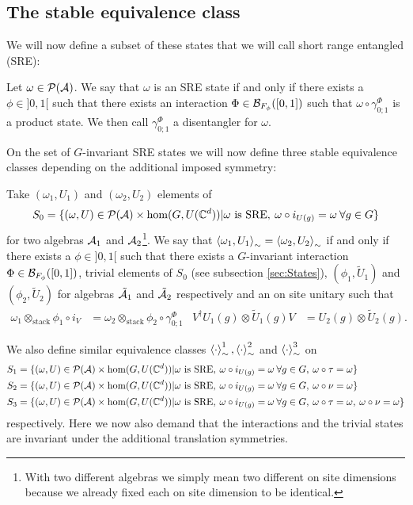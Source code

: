 \documentclass[11pt,a4paper,twoside]{article}
\numberwithin{equation}{section}
\begin{document}
\subsection{The stable equivalence class}\label{sec:StableEquivalenceClasses}
We will now define a subset of these states that we will call short range entangled (SRE):
\begin{definition}\label{def:sre}
	Let $\omega\in\PP(\AA)$. We say that $\omega$ is an SRE state if and only if there exists a $\phi\in]0,1[$ such that there exists an interaction $\Phi\in\BB_{F_\phi}([0,1])$ such that $\omega\circ\gamma^\Phi_{0;1}$ is a product state. We then call $\gamma^\Phi_{0;1}$ a disentangler for $\omega$.
\end{definition}
On the set of $G$-invariant SRE states we will now define three stable equivalence classes depending on the additional imposed symmetry:
\begin{definition}
	Take $(\omega_1,U_1)$ and $(\omega_2,U_2)$ elements of
	\begin{equation}
		S_0=\{(\omega,U)\in\PP(\AA)\times\hom(G,U(\CC^d))|\omega\text{ is SRE},\:\omega\circ i_{U(g)}=\omega\:\forall g\in G\}
	\end{equation}
	for two algebras $\AA_1$ and $\AA_2$\footnote{With two different algebras we simply mean two different on site dimensions because we already fixed each on site dimension to be identical.}. We say that $\expval{\omega_1,U_1}_\sim=\expval{\omega_2,U_2}_\sim$ if and only if there exists a $\phi\in]0,1[$ such that there exists a $G$-invariant interaction $\Phi\in\BB_{F_\phi}([0,1])$, trivial elements of $S_0$ (see subsection \ref{sec:States}), $(\phi_1,\tilde U_1)$ and $(\phi_2,\tilde U_2)$ for algebras $\tilde\AA_1$ and $\tilde\AA_2$ respectively and an on site unitary such that
	\begin{align}
		\omega_1\otimes_{\text{stack}}\phi_1\circ i_V&=\omega_2\otimes_{\text{stack}}\phi_2\circ\gamma^\Phi_{0;1}&V^\dagger U_{1}(g)\otimes \tilde{U}_{1}(g)V&=U_{2}(g)\otimes \tilde{U}_{2}(g).
	\end{align}
\end{definition}
We also define similar equivalence classes $\expval{\cdot}_\sim^1,\expval{\cdot}_\sim^2$ and $\expval{\cdot}_\sim^3$ on
\begin{align}
	S_1&=\{(\omega,U)\in\PP(\AA)\times\hom(G,U(\CC^d))|\omega\text{ is SRE},\:\omega\circ i_{U(g)}=\omega\:\forall g\in G,\:\omega\circ\tau=\omega\}\\
	S_2&=\{(\omega,U)\in\PP(\AA)\times\hom(G,U(\CC^d))|\omega\text{ is SRE},\:\omega\circ i_{U(g)}=\omega\:\forall g\in G,\:\omega\circ\nu=\omega\}\\
	S_3&=\{(\omega,U)\in\PP(\AA)\times\hom(G,U(\CC^d))|\omega\text{ is SRE},\:\omega\circ i_{U(g)}=\omega\:\forall g\in G,\:\omega\circ\tau=\omega,\:\omega\circ\nu=\omega\}
\end{align}
respectively. Here we now also demand that the interactions and the trivial states are invariant under the additional translation symmetries.
\end{document}
